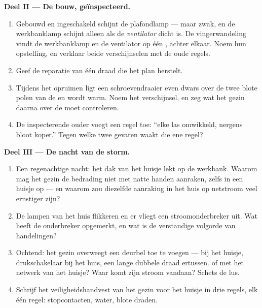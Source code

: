 \begin{problem}
\medskip\noindent\textbf{Deel II --- De bouw, geïnspecteerd.}
\begin{enumerate}[resume]
  \item Gebouwd en ingeschakeld schijnt de plafondlamp --- maar
        zwak, en de werkbanklamp schijnt alleen als de
        \emph{ventilator} dicht is. De vingerwandeling
        vindt de werkbanklamp en de ventilator op één , achter
        elkaar. Noem hun opstelling, en verklaar beide verschijnselen
        met de oude regels.
  \item Geef de reparatie van één draad die het plan herstelt.
  \item Tijdens het opruimen ligt een schroevendraaier even dwars
        over de twee blote polen van de  en wordt warm.
        Noem het verschijnsel, en zeg wat het gezin daarna over de
         moet controleren.
  \item De inspecterende ouder voegt een regel toe: ``elke las
        omwikkeld, nergens bloot koper.'' Tegen welke twee gevaren
        waakt die ene regel?
\end{enumerate}

\medskip\noindent\textbf{Deel III --- De nacht van de storm.}
\begin{enumerate}[resume]
  \item Een regenachtige nacht: het dak van het huisje lekt op de
        werkbank. Waarom mag het gezin de bedrading niet met natte
        handen aanraken, zelfs in een huisje op  --- en
        waarom zou diezelfde aanraking in het huis op netstroom veel
        ernstiger zijn?
  \item De lampen van het huis flikkeren en er vliegt een
        stroomonderbreker uit. Wat heeft de onderbreker opgemerkt, en
        wat is de verstandige volgorde van handelingen?
  \item Ochtend: het gezin overweegt een deurbel toe te voegen ---
         bij het huisje, drukschakelaar bij het huis, een
        lange dubbele draad ertussen.  of  met het
        netwerk van het huisje? Waar komt zijn stroom vandaan? Schets
        de lus.
  \item Schrijf het veiligheidshandvest van het gezin voor het
        huisje in drie regels, elk één regel: stopcontacten, water,
        blote draden.
\end{enumerate}
\end{problem}
